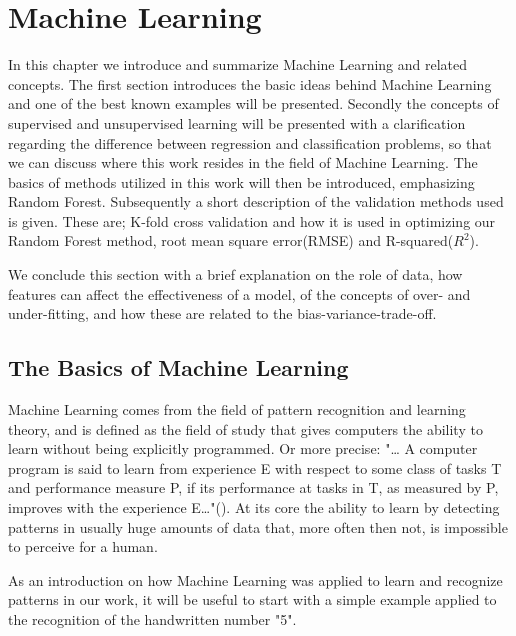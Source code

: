 	
	
\pagebreak
\section{Machine Learning}

In this chapter we introduce and summarize Machine Learning and related concepts. The first section introduces the basic ideas behind Machine Learning and one of the best known examples will be presented. Secondly the concepts of supervised and unsupervised learning will be presented with a clarification regarding the difference between regression and classification problems, so that we can discuss where this work resides in the field of Machine Learning. The basics of methods utilized in this work will then be introduced, emphasizing Random Forest. Subsequently a short description of the validation methods used is given. These are; K-fold cross validation and how it is used in optimizing our Random Forest method, root mean square error(RMSE) and R-squared($R^2$).
   
We conclude this section with a brief explanation on the role of data, how features can affect the effectiveness of a model, of the concepts of over- and under-fitting, and how these are related to the bias-variance-trade-off. 




\subsection{The Basics of Machine Learning}

Machine Learning comes from the field of pattern recognition and learning theory, and is defined as the field of study that gives computers the ability to learn without being explicitly programmed. Or more precise: "… A computer program is said to learn from experience E with respect to some class of tasks T and performance measure P, if its performance at tasks in T, as measured by P, improves with the experience E…"(\cite{mitchell1997machine}). At its core the ability to learn by detecting patterns in usually huge amounts of data that, more often then not, is impossible to perceive for a human. 


	As an introduction on how Machine Learning was applied to learn and recognize patterns in our work, it will be useful to start with a simple example applied to the recognition of the handwritten number "5". 
	

